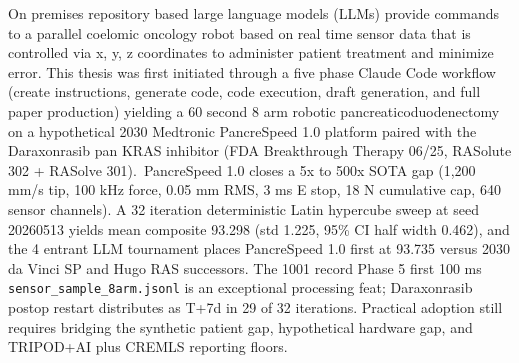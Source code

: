 
On premises repository based large language models (LLMs) provide commands to a parallel coelomic oncology robot based on real time sensor data that is controlled via x, y, z coordinates to administer patient treatment and minimize error. This thesis was first initiated through a five phase Claude Code workflow (create instructions, generate code, code execution, draft generation, and full paper production) yielding a 60 second 8 arm robotic pancreaticoduodenectomy on a hypothetical 2030 Medtronic PancreSpeed 1.0 platform paired with the Daraxonrasib pan KRAS inhibitor (FDA Breakthrough Therapy 06/25, RASolute 302 + RASolve 301).\ PancreSpeed 1.0 closes a 5x to 500x SOTA gap (1,200 mm/s tip, 100 kHz force, 0.05 mm RMS, 3 ms E stop, 18 N cumulative cap, 640 sensor channels). A 32 iteration deterministic Latin hypercube sweep at seed 20260513 yields mean composite 93.298 (std 1.225, 95\% CI half width 0.462), and the 4 entrant LLM tournament places PancreSpeed 1.0 first at 93.735 versus 2030 da Vinci SP and Hugo RAS successors. The 1001 record Phase 5 first 100 ms \texttt{sensor\_sample\_8arm.jsonl} is an exceptional processing feat; Daraxonrasib postop restart distributes as T+7d in 29 of 32 iterations. Practical adoption still requires bridging the synthetic patient gap, hypothetical hardware gap, and TRIPOD+AI plus CREMLS reporting floors.
